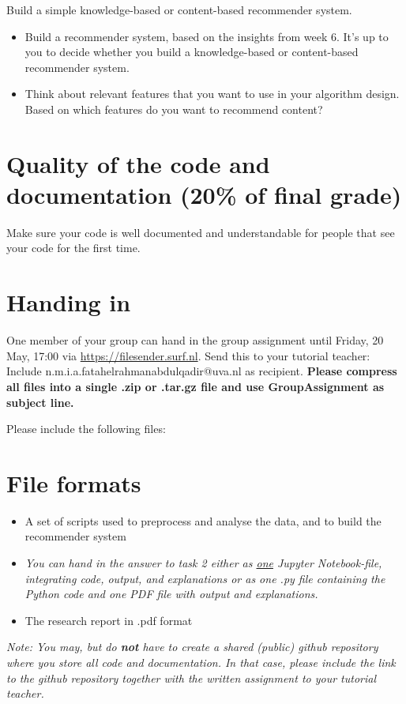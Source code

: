Build a simple knowledge-based or content-based recommender system. 

\begin{itemize}
	\item Build a recommender system, based on the insights from week 6. It's up to you to decide whether you build a knowledge-based or content-based recommender system.
	\item Think about relevant features that you want to use in your algorithm design. Based on which features do you want to recommend content?
\end{itemize}

\section{Quality of the code and documentation (20\% of final grade)}

Make sure your code is well documented and understandable for people that see your code for the first time. 

\section{Handing in}
One member of your group can hand in the group assignment until Friday, 20 May, 17:00 via \url{https://filesender.surf.nl}. Send this to your tutorial teacher: Include n.m.i.a.fatahelrahmanabdulqadir@uva.nl as recipient. \textbf{Please compress all files into a single .zip or .tar.gz file and use GroupAssignment as subject line.} 

Please include the following files:   
\section*{File formats}

\begin{itemize}
	\item  A set of scripts used to preprocess and analyse the data, and to build the recommender system
	\item \emph{
		You can hand in the answer to task 2 \emph{either} as \underline{one} Jupyter Notebook-file, integrating code, output, and explanations \emph{or} as one .py file containing the Python code and one PDF file with output and explanations.
	}
	\item The research report in .pdf format
\end{itemize}

\emph{Note: You may, but do \textbf{not} have to create a shared (public) github repository where you store all code and documentation. In that case, please include the link to the github repository together with the written assignment to your tutorial teacher.}


